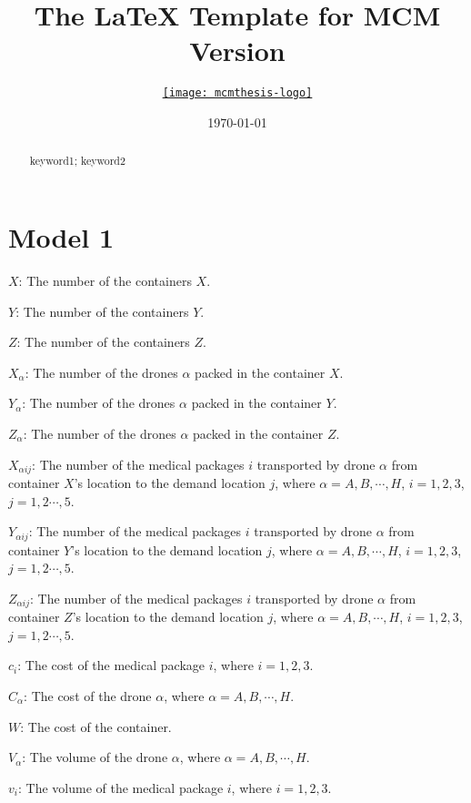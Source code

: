 \documentclass{mcmthesis}
\title{The \LaTeX{} Template for MCM Version \MCMversion}
\author{\small \href{http://www.latexstudio.net/}
  {\texttt{[image: mcmthesis-logo]}}}
\date{\today}
\begin{document}
\begin{abstract}
\lipsum[1]
\begin{keywords}
keyword1; keyword2
\end{keywords}
\end{abstract}
\maketitle
\tableofcontents
\newpage

\section{Model 1}
\noindent $X$: The number of the containers $X$.

\noindent $Y$: The number of the containers $Y$.

\noindent $Z$: The number of the containers $Z$.

\noindent $X_\alpha$: The number of the drones $\alpha$ packed in the container $X$.

\noindent $Y_\alpha$: The number of the drones $\alpha$ packed in the container $Y$.

\noindent $Z_\alpha$: The number of the drones $\alpha$ packed in the container $Z$.

\noindent $X_{\alpha ij}$: The number of the medical packages $i$ transported by drone $\alpha$ from container $X$'s location to the demand location $j$, where $\alpha=A,B,\cdots,H$, $i=1,2,3$, $j=1,2\cdots,5$.

\noindent $Y_{\alpha ij}$: The number of the medical packages $i$ transported by drone $\alpha$ from container $Y$'s location to the demand location $j$, where $\alpha=A,B,\cdots,H$, $i=1,2,3$, $j=1,2\cdots,5$.

\noindent $Z_{\alpha ij}$: The number of the medical packages $i$ transported by drone $\alpha$ from container $Z$'s location to the demand location $j$, where $\alpha=A,B,\cdots,H$, $i=1,2,3$, $j=1,2\cdots,5$.

\noindent $c_i$: The cost of the medical package $i$, where $i=1,2,3$.

\noindent $C_\alpha$: The cost of the drone $\alpha$, where $\alpha=A,B,\cdots,H$.

\noindent $W$: The cost of the container.

\noindent $V_\alpha$: The volume of the drone $\alpha$, where $\alpha=A,B,\cdots,H$.

\noindent $v_i$: The volume of the medical package $i$, where $i=1,2,3$.
\end{document}
